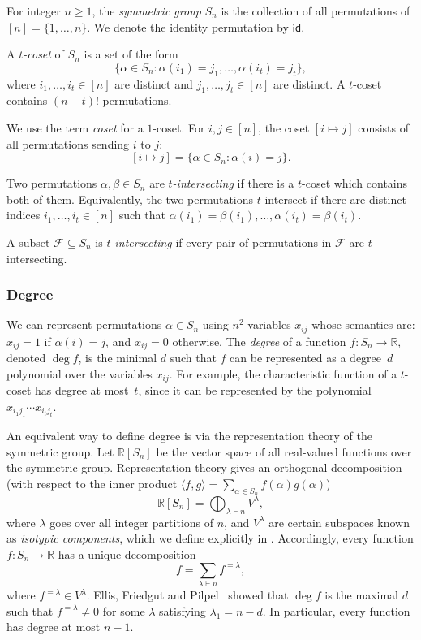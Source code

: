 \documentclass{article}
\theoremstyle{definition}
\providecommand{\coset}[2]{[#1 \mapsto #2]}
\providecommand{\id}{\mathsf{id}}
\begin{document}
For integer $n \geq 1$, the \emph{symmetric group} $S_n$ is the collection of all permutations of $[n] = \{1,\ldots,n\}$. We denote the identity permutation by $\id$.

A \emph{$t$-coset} of $S_n$ is a set of the form
\[
 \{ \alpha \in S_n : \alpha(i_1) = j_1, \ldots, \alpha(i_t) = j_t \},
\]
where $i_1,\ldots,i_t \in [n]$ are distinct and $j_1,\ldots,j_t \in [n]$ are distinct. A $t$-coset contains $(n-t)!$ permutations.

We use the term \emph{coset} for a $1$-coset. For $i,j \in [n]$, the coset $\coset{i}{j}$ consists of all permutations sending $i$ to $j$:
\[
 \coset{i}{j} = \{ \alpha \in S_n : \alpha(i) = j \}.
\]

Two permutations $\alpha,\beta \in S_n$ are \emph{$t$-intersecting} if there is a $t$-coset which contains both of them. Equivalently, the two permutations $t$-intersect if there are distinct indices $i_1,\ldots,i_t \in [n]$ such that $\alpha(i_1) = \beta(i_1),\ldots,\alpha(i_t) = \beta(i_t)$.

A subset $\mathcal{F} \subseteq S_n$ is \emph{$t$-intersecting} if every pair of permutations in $\mathcal{F}$ are $t$-intersecting.

\subsubsection{Degree} \label{sec:degree-sym}

We can represent permutations $\alpha \in S_n$ using $n^2$ variables $x_{ij}$ whose semantics are: $x_{ij} = 1$ if $\alpha(i) = j$, and $x_{ij} = 0$ otherwise. The \emph{degree} of a function $f\colon S_n \to \mathbb{R}$, denoted $\deg f$, is the minimal $d$ such that $f$ can be represented as a degree~$d$ polynomial over the variables $x_{ij}$.
For example, the characteristic function of a $t$-coset has degree at most~$t$, since it can be represented by the polynomial $x_{i_1j_1} \cdots x_{i_tj_t}$.

An equivalent way to define degree is via the representation theory of the symmetric group. Let $\mathbb{R}[S_n]$ be the vector space of all real-valued functions over the symmetric group. Representation theory gives an orthogonal decomposition (with respect to the inner product $\langle f,g \rangle = \sum_{\alpha \in S_n} f(\alpha) g(\alpha)$)
\[
 \mathbb{R}[S_n] = \bigoplus_{\lambda \vdash n} V^\lambda,
\]
where $\lambda$ goes over all integer partitions of $n$, and $V^\lambda$ are certain subspaces known as \emph{isotypic components}, which we define explicitly in . Accordingly, every function $f\colon S_n \to \mathbb{R}$ has a unique decomposition
\[
 f = \sum_{\lambda \vdash n} f^{=\lambda},
\]
where $f^{=\lambda} \in V^\lambda$. 
Ellis, Friedgut and Pilpel~\cite[Theorem 7]{EFP} showed that $\deg f$ is the maximal $d$ such that $f^{=\lambda} \neq 0$ for some $\lambda$ satisfying $\lambda_1 = n - d$. In particular, every function has degree at most $n-1$.
\end{document}

